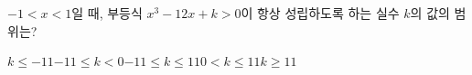 $-1<x<1$일 때, 부등식 $x^3-12x+k>0$이 항상 성립하도록 하는 실수 $k$의 값의 범위는?
\begin{choicesii}{$k\le -11$}{$-11\le k<0$}{$-11\le k\le 11$}{$0<k\le 11$}{$k\ge 11$}\end{choicesii}
